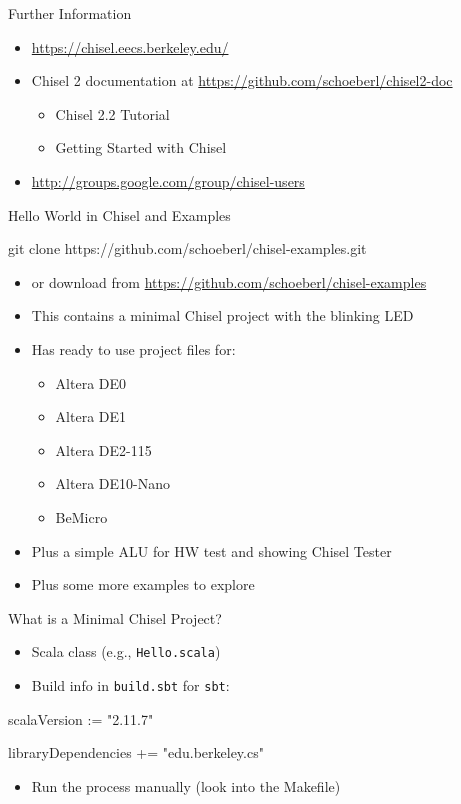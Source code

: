 \documentclass[xcolor=pdflatex,dvipsnames,table]{beamer}
\newcommand{\code}[1]{{\texttt{#1}}}
\begin{document}
\begin{frame}[fragile]{Further Information}
\begin{itemize}
\item \url{https://chisel.eecs.berkeley.edu/}
\item Chisel 2 documentation at \url{https://github.com/schoeberl/chisel2-doc}
\begin{itemize}
\item Chisel 2.2 Tutorial
\item Getting Started with Chisel
\end{itemize}
\item \url{http://groups.google.com/group/chisel-users}
\end{itemize}
\end{frame}


\begin{frame}[fragile]{Hello World in Chisel and Examples}
\begin{chisel}
git clone https://github.com/schoeberl/chisel-examples.git
\end{chisel}
\begin{itemize}
\item or download from \url{https://github.com/schoeberl/chisel-examples}
\item This contains a minimal Chisel project with the blinking LED
\item Has ready to use project files for:
\begin{itemize}
\item Altera DE0
\item Altera DE1
\item Altera DE2-115
\item Altera DE10-Nano
\item BeMicro
\end{itemize}
\item Plus a simple ALU for HW test and showing Chisel Tester
\item Plus some more examples to explore
\end{itemize}
\end{frame}

\begin{frame}[fragile]{What is a Minimal Chisel Project?}
\begin{itemize}
\item Scala class (e.g., \code{Hello.scala})
\item Build info in \code{build.sbt} for \code{sbt}:
\end{itemize}
\begin{chisel}
scalaVersion := "2.11.7"

libraryDependencies += "edu.berkeley.cs" %
\end{chisel}
\begin{itemize}
\item Run the process manually (look into the Makefile)
\end{itemize}
\end{frame}
\end{document}
